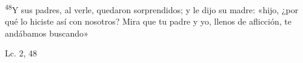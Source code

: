 \documentclass[../../rosario.tex]{subfiles}
\begin{document}
    \textsuperscript{48}Y sus padres, al verle, quedaron sorprendidos; y le dijo su madre: «hijo, ¿por qué lo hiciste así con nosotros? Mira que tu padre
    y yo, llenos de aflicción, te andábamos buscando»
    \begin{flushright}
    Lc. 2, 48     
    \end{flushright}
\end{document}
